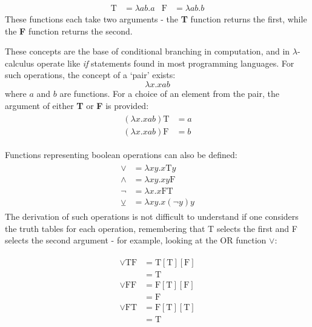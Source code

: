 \documentclass[Master.tex]{subfiles}
\begin{document}
\begin{equation*}
\begin{aligned}
\bm{\mathrm{T}} &= \lambda ab.a
  & %
\bm{\mathrm{F}} &= \lambda ab.b
\end{aligned}
\end{equation*}
These functions each take two arguments - the \textbf{T} function returns the first, while the \textbf{F} function returns the second.

These concepts are the base of conditional branching in computation, and in $\lambda$-calculus operate like \textit{if} statements found in most programming languages. For such operations, the concept of a `pair' exists:
\cite{church1941lambda}
\begin{equation*}
\lambda x.xab
\end{equation*}
where $a$ and $b$ are functions. For a choice of an element from the pair, the argument of either \textbf{T} or \textbf{F} is provided:
\begin{gather*}
\begin{aligned}
(\lambda x.xab)\bm{\mathrm{T}} &= a\\
(\lambda x.xab)\bm{\mathrm{F}} &= b
\end{aligned}
\end{gather*}

Functions representing boolean operations can also be defined:
\cite{rojas2015lambdatutorial}
\begin{gather*}
\begin{aligned}
\vee &= \lambda xy.x\bm{\mathrm{T}}y\\
\wedge &= \lambda xy.xy\bm{\mathrm{F}}\\
\lnot &= \lambda x.x\bm{\mathrm{FT}} \\
\veebar &= \lambda xy.x(\lnot y)y
\end{aligned}
\end{gather*}
The derivation of such operations is not difficult to understand if one considers the truth tables for each operation, remembering that T selects the first and F selects the second argument - for example, looking at the OR function $\vee$:

\begin{gather*}
\begin{aligned}
\vee \bm{\mathrm{TF}} &= \bm{\mathrm{T}}[\bm{\mathrm{T}}][\bm{\mathrm{F}}] \\
&= \bm{\mathrm{T}} \\
\vee \bm{\mathrm{FF}} &= \bm{\mathrm{F}}[\bm{\mathrm{T}}][\bm{\mathrm{F}}] \\
&= \bm{\mathrm{F}} \\
\vee \bm{\mathrm{FT}} &= \bm{\mathrm{F}}[\bm{\mathrm{T}}][\bm{\mathrm{T}}] \\
&= \bm{\mathrm{T}} \\
\end{aligned}
\end{gather*}
\end{document}
